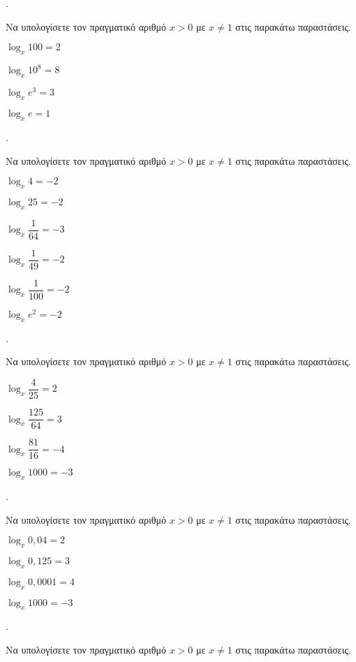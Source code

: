 \documentclass[11pt,a4paper,twocolumn]{article}
\newcounter{askhsh}
\newcommand{\askhsh}{\large\theaskhsh.\ \addtocounter{askhsh}{1}}
\begin{document}
\askhsh Να υπολογίσετε τον πραγματικό αριθμό $ x>0$ με $ x\neq 1 $ στις παρακάτω παραστάσεις.
\begin{multicols}{2}
\begin{alist}
\item $ \log_{x}{100}=2 $
\item $ \log_{x}{10^8}=8 $
\item $ \log_{x}{e^3}=3 $
\item $ \log_{x}{e}=1 $
\end{alist}
\end{multicols}
\askhsh Να υπολογίσετε τον πραγματικό αριθμό $ x>0$ με $ x\neq 1 $ στις παρακάτω παραστάσεις.
\begin{multicols}{2}
\begin{alist}
\item $ \log_{x}{4}=-2 $
\item $ \log_{x}{25}=-2 $
\item $ \log_{x}{\dfrac{1}{64}}=-3 $
\item $ \log_{x}{\dfrac{1}{49}}=-2 $
\item $ \log_{x}{\dfrac{1}{100}}=-2 $
\item $ \log_{x}{e^2}=-2 $
\end{alist}
\end{multicols}
\askhsh Να υπολογίσετε τον πραγματικό αριθμό $ x>0$ με $ x\neq 1 $ στις παρακάτω παραστάσεις.
\begin{multicols}{2}
\begin{alist}
\item $ \log_{x}{\dfrac{4}{25}}=2 $
\item $ \log_{x}{\dfrac{125}{64}}=3 $
\item $ \log_{x}{\dfrac{81}{16}}=-4 $
\item $ \log_{x}{1000}=-3 $
\end{alist}
\end{multicols}
\askhsh Να υπολογίσετε τον πραγματικό αριθμό $ x>0$ με $ x\neq 1 $ στις παρακάτω παραστάσεις.
\begin{multicols}{2}
\begin{alist}
\item $ \log_{x}{0{,}04}=2 $
\item $ \log_{x}{0{,}125}=3 $
\item $ \log_{x}{0{,}0001}=4 $
\item $ \log_{x}{1000}=-3 $
\end{alist}
\end{multicols}
\askhsh Να υπολογίσετε τον πραγματικό αριθμό $ x>0 $ με $ x\neq 1 $ στις παρακάτω παραστάσεις.
\end{document}
